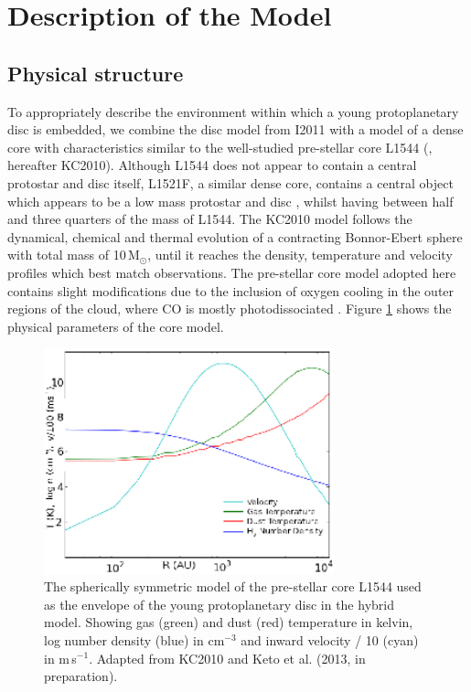 \documentclass[useAMS,usenatbib]{mn2e}
\begin{document}
\section{Description of the Model} \label{sec:description_model}

\subsection{Physical structure} \label{subsec:physical_structure}

To appropriately describe the environment within which a young protoplanetary disc is embedded, we combine the disc model from I2011 with a model of a dense core with characteristics similar to the well-studied pre-stellar core L1544 (\citealt{Keto2010}, hereafter KC2010). Although L1544 does not appear to contain a central protostar and disc itself, L1521F, a similar dense core, contains a central object which appears to be a low mass protostar and disc \citep{Bourke2006}, whilst having between half and three quarters of the mass of L1544. The KC2010 model follows the dynamical, chemical and thermal evolution of a contracting Bonnor-Ebert sphere \citep{Bonnor1956,Ebert1957} with total mass of 10\,M$_{\odot}$, until it reaches the density, temperature and velocity profiles which best match observations. The pre-stellar core model adopted here contains slight modifications due to the inclusion of oxygen cooling in the outer regions of the cloud, where CO is mostly photodissociated \citep{Caselli2012}. Figure \ref{fig:l1544_model} shows the physical parameters of the core model. \smallskip

\begin{figure}
 \includegraphics[width=84mm]{Figures/model/L1544model_used_legend_small.eps}
 \caption{The spherically symmetric model of the pre-stellar core L1544 used as the envelope of the young protoplanetary disc in the hybrid model. Showing gas (green) and dust (red) temperature in kelvin, log number density (blue) in cm$^{-3}$ and inward velocity / 10 (cyan) in m$\,$s$^{-1}$. Adapted from KC2010 and Keto et al. (2013, in preparation).}
 \label{fig:l1544_model}
\end{figure}
\end{document}
